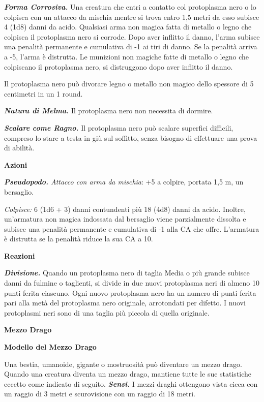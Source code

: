 \begin{multicols}{2}
\emph{\textbf{Forma Corrosiva.}} Una creatura che entri a contatto col
protoplasma nero o lo colpisca con un attacco da mischia mentre si trova
entro 1,5 metri da esso subisce 4 (1d8) danni da acido. Qualsiasi arma
non magica fatta di metallo o legno che colpisca il protoplasma nero si
corrode. Dopo aver inflitto il danno, l'arma subisce una penalità
permanente e cumulativa di -1 ai tiri di danno. Se la penalità arriva a
-5, l'arma è distrutta. Le munizioni non magiche fatte di metallo o
legno che colpiscano il protoplasma nero, si distruggono dopo aver
inflitto il danno.

Il protoplasma nero può divorare legno o metallo non magico dello
spessore di 5 centimetri in un 1 round.

\emph{\textbf{Natura di Melma.}} Il protoplasma nero non necessita di
dormire.

\emph{\textbf{Scalare come Ragno.}} Il protoplasma nero può scalare
superfici difficili, compreso lo stare a testa in giù sul soffitto,
senza bisogno di effettuare una prova di abilità.

\textbf{Azioni}

\emph{\textbf{Pseudopodo.} Attacco con arma da mischia}: +5 a colpire,
portata 1,5 m, un bersaglio.

\emph{Colpisce:} 6 (1d6 + 3) danni contundenti più 18 (4d8) danni da
acido. Inoltre, un'armatura non magica indossata dal bersaglio viene
parzialmente dissolta e subisce una penalità permanente e cumulativa di
-1 alla CA che offre. L'armatura è distrutta se la penalità riduce la
sua CA a 10.

\textbf{Reazioni}

\emph{\textbf{Divisione.}} Quando un protoplasma nero di taglia Media o
più grande subisce danni da fulmine o taglienti, si divide in due nuovi
protoplasma neri di almeno 10 punti ferita ciascuno. Ogni nuovo
protoplasma nero ha un numero di punti ferita pari alla metà del
protoplasma nero originale, arrotondati per difetto. I nuovi protoplasmi
neri sono di una taglia più piccola di quella originale.

\textbf{Mezzo Drago}

\textbf{Modello del Mezzo Drago}

Una bestia, umanoide, gigante o mostruosità può diventare un mezzo
drago. Quando una creatura diventa un mezzo drago, mantiene tutte le sue
statistiche eccetto come indicato di seguito. \emph{\textbf{Sensi.}} I
mezzi draghi ottengono vista cieca con un raggio di 3 metri e
scurovisione con un raggio di 18 metri.


\end{multicols}
